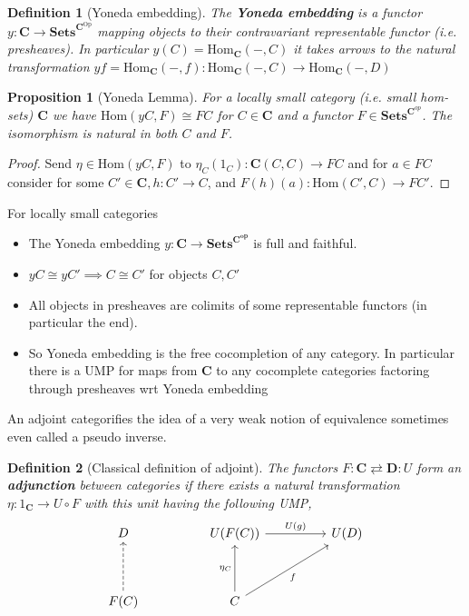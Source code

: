 \documentclass[12pt]{article}
\numberwithin{equation}{section}
\newcommand{\Hom}{{\mathrm{Hom}}}
\newtheorem{definition}{Definition}[section]
\newtheorem{proposition}{Proposition}[section]
\begin{document}
\begin{appendices}
		
		\begin{definition}[Yoneda embedding]
			The \textbf{Yoneda embedding} is a functor $y:\mathbf{C}\to \mathbf{Sets}^{\mathbf{C}^\text{Op}}$ mapping objects to their contravariant representable functor (i.e. presheaves). In particular $y(C)=\textrm{Hom}_\mathbf{C}(-,C)$ it takes arrows to the natural transformation $yf=\mathrm{Hom}_\mathbf{C}(-,f):\mathrm{Hom}_\mathbf{C}(-,C) \to \mathrm{Hom}_\mathbf{C}(-,D)$
			
		\end{definition}
		
		\begin{proposition}[Yoneda Lemma]
			For a locally small category (i.e. small hom-sets) $\mathbf{C}$ we have $\textrm{Hom}(yC,F) \cong FC$ for $C \in \mathbf{C}$ and a functor $F \in \mathbf{Sets}^{\mathbf{C}^{op}}$. The isomorphism is natural in both $C$ and $F$.
		\end{proposition}
		\begin{proof}
			Send $\eta \in \Hom(yC, F)$ to $\eta_C(1_C) : \mathbf{C}(C,C)\to FC$	and for $ a \in FC$ consider for some $C'\in \mathbf{C}, h: C' \to C$, and $F(h)(a): \Hom(C',C) \to FC'$.	
		\end{proof}
		For locally small categories
		\begin{itemize}
			\item The Yoneda embedding $y: \mathbf{C} \to \mathbf{Sets}^{\mathbf{C}^\mathbf{op}}$ is full and faithful.
			\item $yC \cong yC' \implies C \cong C'$ for objects $C,C'$
			\item All objects in presheaves are colimits of some representable functors (in particular the end). 
			\item So Yoneda embedding is the free cocompletion of any category. In particular there is a UMP for maps from $\mathbf{C}$ to any cocomplete categories factoring through presheaves wrt Yoneda embedding
		\end{itemize}	
		An adjoint categorifies the idea of a very weak notion of equivalence sometimes even called a pseudo inverse.
		\begin{definition}[Classical definition of adjoint]
			The functors $F: \mathbf{C} \rightleftarrows \mathbf{D}: U$ form an \textbf{adjunction} between categories if there exists a natural transformation $\eta: 1_\mathbf{C} \to U \circ F$ with this unit having the following UMP,
			\[\begin{tikzcd}
				D && {U(F(C))} && {U(D)} \\
				\\
				{F(C)} && C
				\arrow["f"', from=3-3, to=1-5]
				\arrow["{\eta_C}", from=3-3, to=1-3]
				\arrow["{U(g)}", from=1-3, to=1-5]
				\arrow[dashed, from=3-1, to=1-1]
			\end{tikzcd}\]
			

\end{definition}
\end{appendices}
\end{document}
